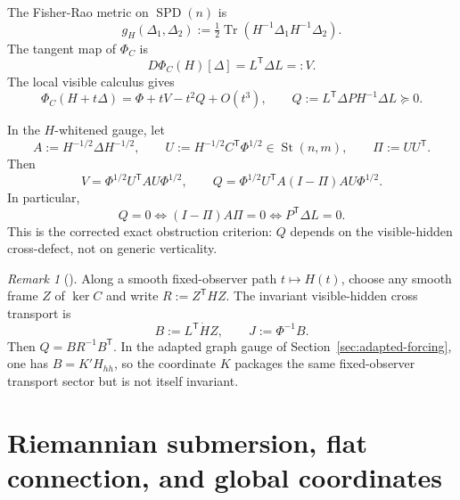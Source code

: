 \documentclass[11pt,a4paper]{article}
\numberwithin{equation}{section}
\DeclareMathOperator{\Tr}{Tr}
\DeclareMathOperator{\SPD}{SPD}
\DeclareMathOperator{\St}{St}
\theoremstyle{thmcompact}
\theoremstyle{remark}
\newtheorem*{remarkplain}{Remark}
\newenvironment{remark}[1][]%
{\begin{remarkbox}\begin{remarkplain}[#1]\normalfont}
{\end{remarkplain}\end{remarkbox}}
\begin{document}
The Fisher-Rao metric on $\SPD(n)$ is
\begin{equation}
g_H(\Delta_1,\Delta_2):=\tfrac12\Tr(H^{-1}\Delta_1 H^{-1}\Delta_2).
\label{eq:fisher-metric}
\end{equation}
The tangent map of $\Phi_C$ is
\begin{equation}
D\Phi_C(H)[\Delta]=L^{\mathsf T}\Delta L=:V.
\label{eq:tangent-map}
\end{equation}
The local visible calculus gives
\begin{equation}
\Phi_C(H+t\Delta)=\Phi+tV-t^2Q+O(t^3),
\qquad
Q:=L^{\mathsf T}\Delta P H^{-1}\Delta L\succeq 0.
\label{eq:local-calculus}
\end{equation}

In the $H$-whitened gauge, let
\begin{equation}
A:=H^{-1/2}\Delta H^{-1/2},
\qquad
U:=H^{-1/2}C^{\mathsf T}\Phi^{1/2}\in\St(n,m),
\qquad
\Pi:=UU^{\mathsf T}.
\label{eq:whitened-data}
\end{equation}
Then
\begin{equation}
V=\Phi^{1/2}U^{\mathsf T}AU\Phi^{1/2},
\qquad
Q=\Phi^{1/2}U^{\mathsf T}A(I-\Pi)AU\Phi^{1/2}.
\label{eq:VQ-whitened}
\end{equation}
In particular,
\begin{equation}
Q=0
\iff
(I-\Pi)A\Pi=0
\iff
P^{\mathsf T}\Delta L=0.
\label{eq:q-zero-cross}
\end{equation}
This is the corrected exact obstruction criterion: $Q$ depends on the visible-hidden cross-defect, not on generic verticality.

\begin{remark}
Along a smooth fixed-observer path $t\mapsto H(t)$, choose any smooth frame $Z$ of $\ker C$ and write $R:=Z^{\mathsf T}HZ$. The invariant visible-hidden cross transport is
\[
B:=L^{\mathsf T}\dot H Z,
\qquad
J:=\Phi^{-1}B.
\]
Then $Q=BR^{-1}B^{\mathsf T}$. In the adapted graph gauge of Section~\ref{sec:adapted-forcing}, one has $B=K'H_{hh}$, so the coordinate $K$ packages the same fixed-observer transport sector but is not itself invariant.
\end{remark}

\section{Riemannian submersion, flat connection, and global coordinates}
\end{document}
